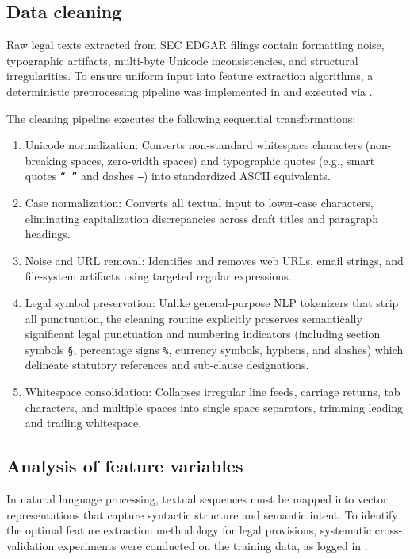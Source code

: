 \subsection{Data cleaning}
\label{subsec:data_cleaning}

Raw legal texts extracted from SEC EDGAR filings contain formatting noise, typographic artifacts, multi-byte Unicode inconsistencies, and structural irregularities. To ensure uniform input into feature extraction algorithms, a deterministic preprocessing pipeline was implemented in  and executed via .

The cleaning pipeline executes the following sequential transformations:
\begin{enumerate}
    \item Unicode normalization: Converts non-standard whitespace characters (non-breaking spaces, zero-width spaces) and typographic quotes (e.g., smart quotes \texttt{``\,''} and dashes \texttt{---}) into standardized ASCII equivalents.
    \item Case normalization: Converts all textual input to lower-case characters, eliminating capitalization discrepancies across draft titles and paragraph headings.
    \item Noise and URL removal: Identifies and removes web URLs, email strings, and file-system artifacts using targeted regular expressions.
    \item Legal symbol preservation: Unlike general-purpose NLP tokenizers that strip all punctuation, the cleaning routine explicitly preserves semantically significant legal punctuation and numbering indicators (including section symbols \texttt{\S}, percentage signs \texttt{\%}, currency symbols, hyphens, and slashes) which delineate statutory references and sub-clause designations.
    \item Whitespace consolidation: Collapses irregular line feeds, carriage returns, tab characters, and multiple spaces into single space separators, trimming leading and trailing whitespace.
\end{enumerate}

\subsection{Analysis of feature variables}
\label{subsec:feature_analysis}

In natural language processing, textual sequences must be mapped into vector representations that capture syntactic structure and semantic intent. To identify the optimal feature extraction methodology for legal provisions, systematic cross-validation experiments were conducted on the training data, as logged in .


